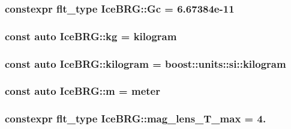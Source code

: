 \subsubsection[{Gc}]{\setlength{\rightskip}{0pt plus 5cm}constexpr {\bf flt\+\_\+type} Ice\+B\+R\+G\+::\+Gc = 6.\+67384e-\/11}\label{namespaceIceBRG_ae34ca33d4c7073fde8efcc53cf6fd5f4}
\hypertarget{namespaceIceBRG_a9233960f6792ea35145d7db55c13e85d}{}
\subsubsection[{kg}]{\setlength{\rightskip}{0pt plus 5cm}const auto Ice\+B\+R\+G\+::kg = {\bf kilogram}}\label{namespaceIceBRG_a9233960f6792ea35145d7db55c13e85d}
\hypertarget{namespaceIceBRG_aaf220eb7f44e1dc31c74784c7e1ff646}{}
\subsubsection[{kilogram}]{\setlength{\rightskip}{0pt plus 5cm}const auto Ice\+B\+R\+G\+::kilogram = boost\+::units\+::si\+::kilogram}\label{namespaceIceBRG_aaf220eb7f44e1dc31c74784c7e1ff646}
\hypertarget{namespaceIceBRG_ada6365c5d16106f0608afbd34f010bcc}{}
\subsubsection[{m}]{\setlength{\rightskip}{0pt plus 5cm}const auto Ice\+B\+R\+G\+::m = {\bf meter}}\label{namespaceIceBRG_ada6365c5d16106f0608afbd34f010bcc}
\hypertarget{namespaceIceBRG_a2396686715e28d2b62baac2dfb9021a9}{}
\subsubsection[{mag\+\_\+lens\+\_\+\+T\+\_\+max}]{\setlength{\rightskip}{0pt plus 5cm}constexpr {\bf flt\+\_\+type} Ice\+B\+R\+G\+::mag\+\_\+lens\+\_\+\+T\+\_\+max = 4.}\label{namespaceIceBRG_a2396686715e28d2b62baac2dfb9021a9}
\hypertarget{namespaceIceBRG_ac8678d1f61a28341bc7157159256bb3b}{}
